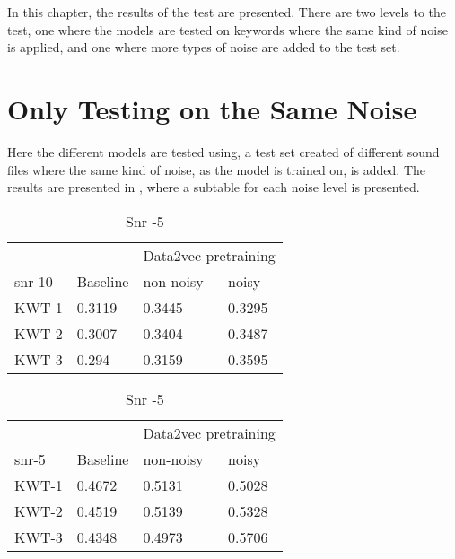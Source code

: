 In this chapter, the results of the test are presented. There are two levels to the test, one where the models are tested on keywords where the same kind of noise is applied, and one where more types of noise are added to the test set.

\section{Only Testing on the Same Noise}
Here the different models are tested using, a test set created of different sound files where the same kind of noise, as the model is trained on, is added. The results are presented in , where a subtable for each noise level is presented. 
\begin{table}[ht]
    \centering
    \begin{subtable}[ht]{0.45\textwidth}
        \centering
        \begin{tabular}{@{}llll@{}}
        \toprule
        & & \multicolumn{2}{c}{Data2vec pretraining} \\ \cline{3-4}
        snr-10    & Baseline & non-noisy & noisy \\ \midrule
        KWT-1    & 0.3119  & 0.3445 & 0.3295 \\
        KWT-2    & 0.3007  & 0.3404 & 0.3487 \\
        KWT-3    & 0.294  & 0.3159 & 0.3595 \\
        \bottomrule
        \end{tabular}
        \caption{Snr -10}
    \end{subtable}
    \hfill
    \begin{subtable}[ht]{0.45\textwidth}
        \centering
        \begin{tabular}{@{}llll@{}}
        \toprule
        & & \multicolumn{2}{c}{Data2vec pretraining} \\ \cline{3-4}
        snr-5    & Baseline & non-noisy & noisy \\ \midrule
        KWT-1    & 0.4672  & 0.5131 & 0.5028 \\
        KWT-2    & 0.4519  & 0.5139 & 0.5328 \\
        KWT-3    & 0.4348  & 0.4973 & 0.5706 \\
        \bottomrule
        \end{tabular}
        \caption{Snr -5}
    \end{subtable}
     
     
    \bigskip



\end{table}
